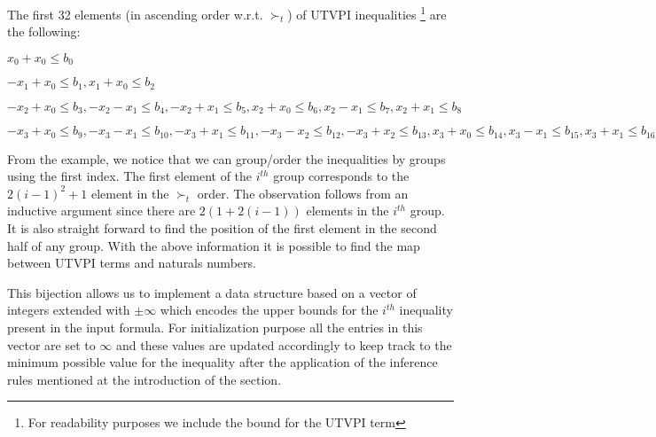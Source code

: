 \begin{example}
  The first 32 elements (in ascending order w.r.t. $\succ_t$) of UTVPI inequalities
  \footnote{For readability purposes we include the bound for the UTVPI term }
  are the following:

  $x_{0} + x_{0} \leq b_{0}$

  $-x_{1} + x_{0} \leq b_{1}, x_{1} + x_{0} \leq b_{2}$ 

  $-x_{2} + x_{0} \leq b_{3}, -x_{2} - x_{1} \leq b_{4}, -x_{2} + x_{1} \leq b_{5}, x_{2} + x_{0} \leq b_{6}, x_{2} - x_{1} \leq b_{7}, x_{2} + x_{1} \leq b_{8}$

  $-x_{3} + x_{0} \leq b_{9}, -x_{3} - x_{1} \leq b_{10}, -x_{3} + x_{1} \leq b_{11}, -x_{3} - x_{2} \leq b_{12}, -x_{3} + x_{2} \leq b_{13},x_{3} + x_{0} \leq b_{14}, x_{3} - x_{1} \leq b_{15}, x_{3} + x_{1} \leq b_{16}, x_{3} - x_{2} \leq b_{17}, x_{3} + x_{2} \leq b_{18}$
\end{example}

From the example, we notice that we can group/order the inequalities by groups using the first
index. The first element of the $i^{th}$ group corresponds to the $2(i-1)^2 + 1$ element in the 
$\succ_t$ order. The observation follows from an inductive argument since there are 
$2(1 + 2(i-1))$ elements in the $i^{th}$ group. It is also straight forward to find the
position of the first element in the second half of any group. With the above information
it is possible to find the map between UTVPI terms and naturals numbers.

This bijection allows us to implement a data 
structure based on a vector of integers extended
with $\pm \infty$ which encodes the upper bounds 
for the $i^{th}$ inequality present in the 
input formula. For initialization purpose all 
the entries in this vector are set to
$\infty$ and these values are updated accordingly 
to keep track to the minimum possible value 
for the inequality after the application of the 
inference rules mentioned at the
introduction of the section.

